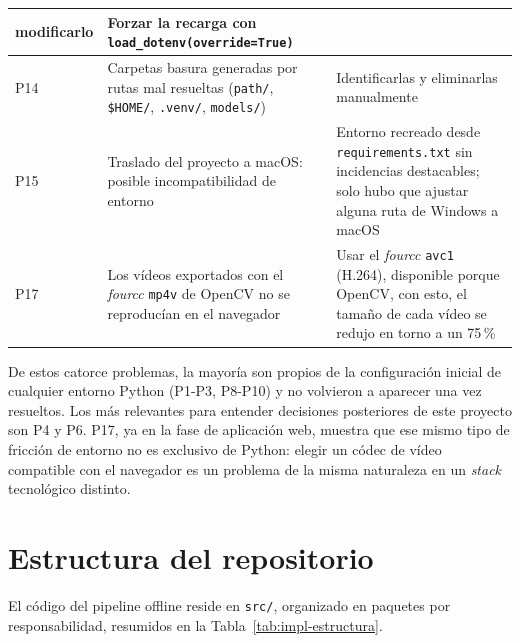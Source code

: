 \begin{table}[htp]
\begin{tabular}{|p{0.7cm}|p{5.5cm}|p{5.3cm}|}
  modificarlo & Forzar la recarga con \texttt{load\_dotenv(override=True)} \\
\hline
P14 & Carpetas basura generadas por rutas mal resueltas
  (\texttt{path/}, \texttt{\$HOME/}, \texttt{.venv/}, \texttt{models/}) &
  Identificarlas y eliminarlas manualmente \\
\hline
P15 & Traslado del proyecto a macOS: posible incompatibilidad de entorno &
  Entorno recreado desde \texttt{requirements.txt} sin incidencias
  destacables; solo hubo que ajustar alguna ruta de Windows a macOS \\
\hline
P17 & Los vídeos exportados con el \emph{fourcc} \texttt{mp4v} de OpenCV no
  se reproducían en el navegador & Usar el \emph{fourcc} \texttt{avc1}
  (H.264), disponible porque OpenCV, con esto, el tamaño de cada vídeo se redujo en torno a un 75\,\% \\
\hline
\end{tabular}
\end{table}

De estos catorce problemas, la mayoría son propios de la configuración
inicial de cualquier entorno Python (P1-P3, P8-P10) y no volvieron a
aparecer una vez resueltos. Los más relevantes para entender decisiones
posteriores de este proyecto son P4 y P6.
P17, ya en la fase de aplicación web, muestra que ese mismo tipo de
fricción de entorno no es exclusivo de Python: elegir un códec de vídeo
compatible con el navegador es un problema de la misma naturaleza en un
\emph{stack} tecnológico distinto.

\section{Estructura del repositorio}
\label{sec:implementacion-estructura}

El código del pipeline offline reside en \texttt{src/}, organizado en
paquetes por responsabilidad, resumidos en la
Tabla~\ref{tab:impl-estructura}.

